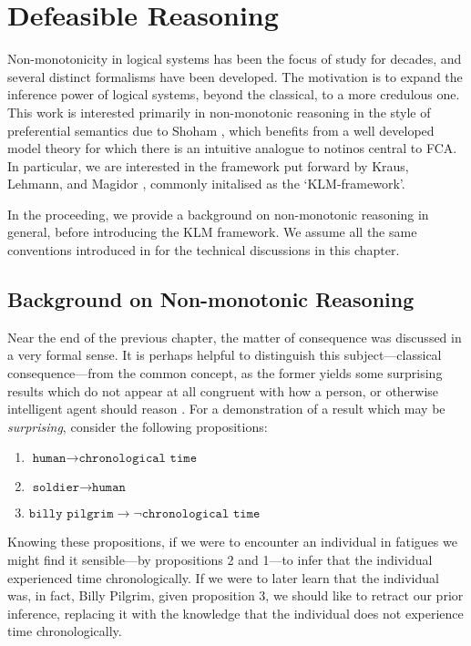 \chapter{Defeasible Reasoning}
\label{chapter:defeasible-reasoning}

Non-monotonicity in logical systems has been the focus of study for decades, and several distinct formalisms have been developed. The motivation is to expand the inference power of logical systems, beyond the classical, to a more credulous one. This work is interested primarily in non-monotonic reasoning in the style of preferential semantics due to Shoham \cite{shohamSemanticApproach}, which benefits from a well developed model theory for which there is an intuitive analogue to notinos central to FCA. In particular, we are interested in the framework put forward by Kraus, Lehmann, and Magidor \cite{kraus1990nonmonotonic,lehmann1992what}, commonly initalised as the `KLM-framework'.

In the proceeding, we provide a background on non-monotonic reasoning in general, before introducing the KLM framework. We assume all the same conventions introduced in  for the technical discussions in this chapter.
\section{Background on Non-monotonic Reasoning}
\label{section:nmr-background}
Near the end of the previous chapter, the matter of consequence was discussed in a very formal sense. It is perhaps helpful to distinguish this subject---classical consequence---from the common concept, as the former yields some surprising results which do not appear at all congruent with how a person, or otherwise intelligent agent should reason \cite{tarski1936consequence, kraus1990nonmonotonic}. For a demonstration of a result which may be \textit{surprising}, consider the following propositions:

\begin{enumerate}
     \item $\texttt{human} \rightarrow \texttt{chronological time}$
     \item $\texttt{soldier} \rightarrow \texttt{human}$
     \item $\texttt{billy pilgrim} \rightarrow \neg \texttt{chronological time}$
\end{enumerate}

Knowing these propositions, if we were to encounter an individual in fatigues we might find it sensible---by propositions 2 and 1---to infer that the individual experienced time chronologically. If we were to later learn that the individual was, in fact, Billy Pilgrim, given proposition 3, we should like to retract our prior inference, replacing it with the knowledge that the individual does not experience time chronologically.

